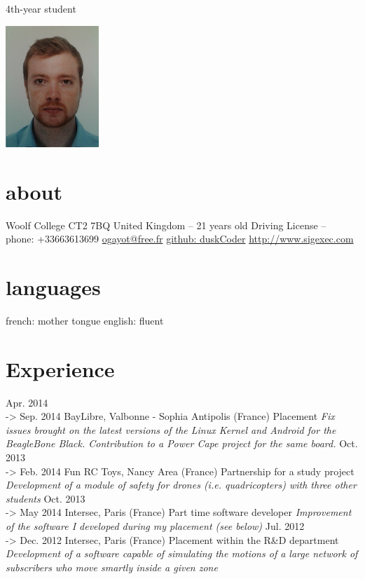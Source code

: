 \documentclass[]{friggeri-cv}
\begin{document}
       {4th-year student}


\begin{aside}
    \includegraphics[width=100pt]{photo.png}
  \section{about}
    Woolf College
    CT2 7BQ
    United Kingdom
    --
    21 years old
    Driving License
    --
    ~
    phone: +33663613699
    \href{mailto:ogayot@free.fr}{ogayot@free.fr}
    \href{https://github.com/duskCoder}{github: duskCoder}
    \href{http://www.sigexec.com}{http://www.sigexec.com}
  \section{languages}
    french: mother tongue
    english: fluent
\end{aside}

\section{Experience}

\begin{entrylist}
  \entry
    {Apr. 2014 \\-> Sep. 2014}
    {BayLibre, Valbonne - Sophia Antipolis (France)}
    {Placement}
    {\emph{Fix issues brought on the latest versions of the Linux Kernel and Android for the BeagleBone Black. Contribution to a Power Cape project for the same board.}}
  \entry
    {Oct. 2013 \\-> Feb. 2014}
    {Fun RC Toys, Nancy Area (France)}
    {Partnership for a study project}
    {\emph{Development of a module of safety for drones (i.e. quadricopters) with three other students}}
  \entry
    {Oct. 2013 \\-> May 2014}
    {Intersec, Paris (France)}
    {Part time software developer}
    {\emph{Improvement of the software I developed during my placement (see below)}}
  \entry
    {Jul. 2012 \\-> Dec. 2012}
    {Intersec, Paris (France)}
    {Placement within the R\&D department}
    {\emph{Development of a software capable of simulating the motions of a large network of subscribers who move smartly inside a given zone}}
\end{entrylist}
\end{document}
